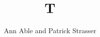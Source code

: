 \documentclass{amsart}
\begin{document}
\title{T}
\author{Ann Able and Patrick Strasser}
\maketitle
\end{document}
